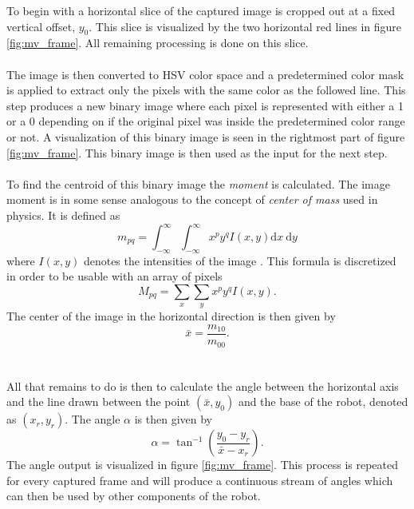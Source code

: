 To begin with a horizontal slice of the captured image is cropped out at a fixed vertical offset, $y_0$. This slice is visualized by the two horizontal red lines in figure \ref{fig:mv_frame}.
All remaining processing is done on this slice.
\\ \\
The image is then converted to HSV color space and a predetermined color mask is applied to extract only the pixels with the same color as the followed line.
This step produces a new binary image where each pixel is represented with either a 1 or a 0 depending on if the original pixel was inside the predetermined color range or not.
A visualization of this binary image is seen in the rightmost part of figure \ref{fig:mv_frame}.
This binary image is then used as the input for the next step.
\\ \\
To find the centroid of this binary image the \emph{moment} is calculated. The image moment is in some sense analogous to the concept of \emph{center of mass} used in physics. It is defined as
\begin{equation}
	m_{p q}=\int_{-\infty}^{\infty} \int_{-\infty}^{\infty} x^{p} y^{q} I(x, y) \mathrm{d} x \mathrm{~d} y
\end{equation}
where $I(x,y)$ denotes the intensities of the image \cite{moment}.
This formula is discretized in order to be usable with an array of pixels
\begin{equation}
	M_{p q}=\sum_{x} \sum_{y} x^{p} y^{q} I(x, y).
\end{equation}
The center of the image in the horizontal direction is then given by
\begin{equation}
	\bar{x} = \frac{m_{10}}{m_{00}}.
\end{equation}
\\ \\
All that remains to do is then to calculate the angle between the horizontal axis and the line drawn between the point $(\bar{x}, y_0)$ and the base of the robot, denoted as $(x_r, y_r)$.
The angle $\alpha$ is then given by
\begin{equation}
	\alpha = \tan^{-1}\left(\frac{y_0 - y_r}{\bar{x} - x_r}\right).
\end{equation}
The angle output is visualized in figure \ref{fig:mv_frame}.
This process is repeated for every captured frame and will produce a continuous stream of angles which can then be used by other components of the robot.

